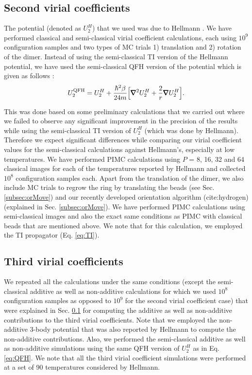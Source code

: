     \subsection{Second virial coefficients}
    \label{subsubsec:b2n2}
        The \abinitio{} potential (denoted as $U_2^H$) that we used was due to Hellmann \cite{Hellmann2013}. We have performed classical and semi-classical virial coefficient calculations, each using $10^9$ configuration samples and two types of MC trials 1) translation and 2) rotation of the dimer. Instead of using the semi-classical TI version of the Hellmann potential, we have used the semi-classical QFH version of the potential which is given as follows \cite{Feynman,Schenter2002}:
        \begin{equation}
        \label{eq:QFH}
            U_2^{\rm QFH} = U_2^H + \displaystyle\frac{\hbar^2 \beta}{24 m} \Big[ \pmb{\nabla}^2 U_2^H + \frac{2}{r} \pmb{\nabla} U_2^H \Big].
        \end{equation}

        This was done based on some preliminary calculations that we carried out where we failed to observe any significant improvement in the precision of the results while using the semi-classical TI version of $U_2^H$ (which was done by Hellmann). Therefore we expect significant differences while comparing our virial coefficient values for the semi-classical calculations against Hellmann's, especially at low temperatures. We have performed PIMC calculations using $P$ = 8, 16, 32 and 64 classical images for each of the temperatures reported by Hellmann and collected $10^8$ configuration samples each. Apart from the translation of the dimer, we also include MC trials to regrow the ring by translating the beads (see Sec. \ref{subsec:orMove}) and our recently developed orientation algorithm (cite:hydrogen) (explained in Sec. \ref{subsec:orMove}). We have performed PIMC calculations using semi-classical images and also the exact same conditions as PIMC with classical beads that are mentioned above. We note that for this calculation, we employed the TI propagator (Eq. \eqref{eq:TI}).

    \subsection{Third virial coefficients}
        We repeated all the calculations under the same conditions (except the semi-classical additive as well as non-additive calculations for which we used $10^8$ configuration samples as opposed to $10^9$ for the second virial coefficient case) that were explained in Sec. \ref{subsubsec:b2n2} for computing the additive as well as non-additive contributions to the third virial coefficients. Note that we employed the non-additive 3-body potential that was also reported by Hellmann \cite{Hellmann2013} to compute the non-additive contributions. Also, we performed the semi-classical additive as well as non-additive simulations using the same QFH version of $U_2^H$ as in Eq. \eqref{eq:QFH}. We note that all the third virial coefficient simulations were performed at a set of 90 temperatures considered by Hellmann.
